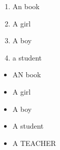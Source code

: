 \documentclass{article}
\begin{document}
\begin{enumerate}
    \item An book
    \item A girl
    \item A boy
    \item a student

\end{enumerate}

\begin{itemize}
    \item AN book
    \item A girl
    \item A boy
    \item A student
    \item A TEACHER
\end{itemize}
\end{document}
